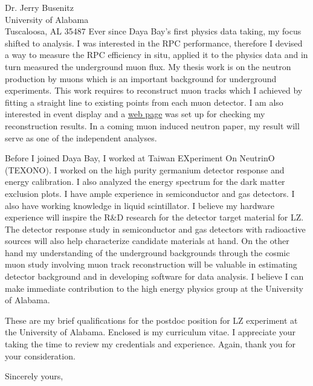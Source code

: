 \documentclass{letter} %
\begin{document}
\begin{letter}{Dr. Jerry Busenitz \\
University of Alabama \\
Tuscaloosa, AL 35487}
Ever since Daya Bay's first physics data taking, my focus shifted to analysis. I was interested in the RPC performance, therefore I devised a way to measure the RPC efficiency in situ, applied it to the physics data and in turn measured the underground muon flux. My thesis work is on the neutron production by muons which is an important background for underground experiments. This work requires to reconstruct muon tracks which I achieved by fitting a straight line to existing points from each muon detector. I am also interested in event display and a \href{http://heplinux3.phys.uh.edu/~sklin/WebTryout/MuonViewer/v0-4-3-1/main.html}{web page} was set up for checking my reconstruction results. In a coming muon induced neutron paper, my result will serve as one of the independent analyses.

Before I joined Daya Bay, I worked at Taiwan EXperiment On NeutrinO (TEXONO). I worked on the high purity germanium detector response and energy calibration. I also analyzed the energy spectrum for the dark matter exclusion plots. I have ample experience in semiconductor and gas detectors. I also have working knowledge in liquid scintillator. I believe my hardware experience will inspire the R\&D research for the detector target material for LZ. The detector response study in semiconductor and gas detectors with radioactive sources will also help characterize candidate materials at hand. On the other hand my understanding of the underground backgrounds through the cosmic muon study involving muon track reconstruction will be valuable in estimating detector background and in developing software for data analysis. I believe I can make immediate contribution to the high energy physics group at the University of Alabama.


\noindent %
These are my brief qualifications for the postdoc position for LZ experiment at the University of Alabama. Enclosed is my curriculum vitae. I appreciate your taking the time to review my credentials and experience. Again, thank you for your consideration. 
 
\closing{Sincerely yours,} 
 

 

\end{letter}
 
\end{document}
